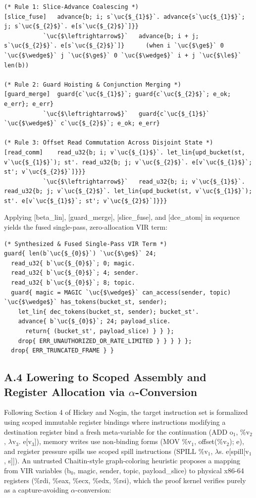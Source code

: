 \begin{lstlisting}[basicstyle=\ttfamily\footnotesize]
(* Rule 1: Slice-Advance Coalescing *)
[slice_fuse]   advance{b; i; s`\uc{$_{1}$}`. advance{s`\uc{$_{1}$}`; j; s`\uc{$_{2}$}`. e[s`\uc{$_{2}$}`]}}
           `\uc{$\leftrightarrow$}`   advance{b; i + j; s`\uc{$_{2}$}`. e[s`\uc{$_{2}$}`]}      (when i `\uc{$\ge$}` 0 `\uc{$\wedge$}` j `\uc{$\ge$}` 0 `\uc{$\wedge$}` i + j `\uc{$\le$}` len(b))

(* Rule 2: Guard Hoisting & Conjunction Merging *)
[guard_merge]  guard{c`\uc{$_{1}$}`; guard{c`\uc{$_{2}$}`; e_ok; e_err}; e_err}
           `\uc{$\leftrightarrow$}`   guard{c`\uc{$_{1}$}` `\uc{$\wedge$}` c`\uc{$_{2}$}`; e_ok; e_err}

(* Rule 3: Offset Read Commutation Across Disjoint State *)
[read_comm]    read_u32{b; i; v`\uc{$_{1}$}`. let_lin{upd_bucket(st, v`\uc{$_{1}$}`); st'. read_u32{b; j; v`\uc{$_{2}$}`. e[v`\uc{$_{1}$}`; st'; v`\uc{$_{2}$}`]}}}
           `\uc{$\leftrightarrow$}`   read_u32{b; i; v`\uc{$_{1}$}`. read_u32{b; j; v`\uc{$_{2}$}`. let_lin{upd_bucket(st, v`\uc{$_{1}$}`); st'. e[v`\uc{$_{1}$}`; st'; v`\uc{$_{2}$}`]}}}
\end{lstlisting}
Applying [beta\_lin], [guard\_merge], [slice\_fuse], and [dce\_atom] in sequence yields the fused single-pass, zero-allocation VIR term:

\begin{lstlisting}
(* Synthesized & Fused Single-Pass VIR Term *)
guard{ len(b`\uc{$_{0}$}`) `\uc{$\ge$}` 24;
  read_u32{ b`\uc{$_{0}$}`; 0; magic.
  read_u32{ b`\uc{$_{0}$}`; 4; sender.
  read_u32{ b`\uc{$_{0}$}`; 8; topic.
  guard{ magic = MAGIC `\uc{$\wedge$}` can_access(sender, topic) `\uc{$\wedge$}` has_tokens(bucket_st, sender);
    let_lin{ dec_tokens(bucket_st, sender); bucket_st'.
    advance{ b`\uc{$_{0}$}`; 24; payload_slice.
      return{ (bucket_st', payload_slice) } } };
    drop{ ERR_UNAUTHORIZED_OR_RATE_LIMITED } } } } };
  drop{ ERR_TRUNCATED_FRAME } }
\end{lstlisting}

\subsection*{A.4 Lowering to Scoped Assembly and Register Allocation via \ensuremath{\alpha}-Conversion}
Following Section 4 of Hickey and Nogin, the target instruction set is formalized using scoped immutable register bindings where instructions modifying a destination register bind a fresh meta-variable for the continuation (ADD o\ensuremath{_{1}}, \%v\ensuremath{_{2}}, \ensuremath{\lambda}v\ensuremath{_{3}}. e[v\ensuremath{_{3}}]), memory writes use non-binding forms (MOV \%v\ensuremath{_{1}}, offset(\%v\ensuremath{_{2}}); e), and register pressure spills use scoped spill instructions (SPILL \%v\ensuremath{_{1}}, \ensuremath{\lambda}s. e[spill[v\ensuremath{_{1}}, s]]). An untrusted Chaitin-style graph-coloring heuristic proposes a mapping from VIR variables (b\ensuremath{_{0}}, magic, sender, topic, payload\_slice) to physical x86-64 registers (\%rdi, \%eax, \%ecx, \%edx, \%rsi), which the proof kernel verifies purely as a capture-avoiding \ensuremath{\alpha}-conversion:

